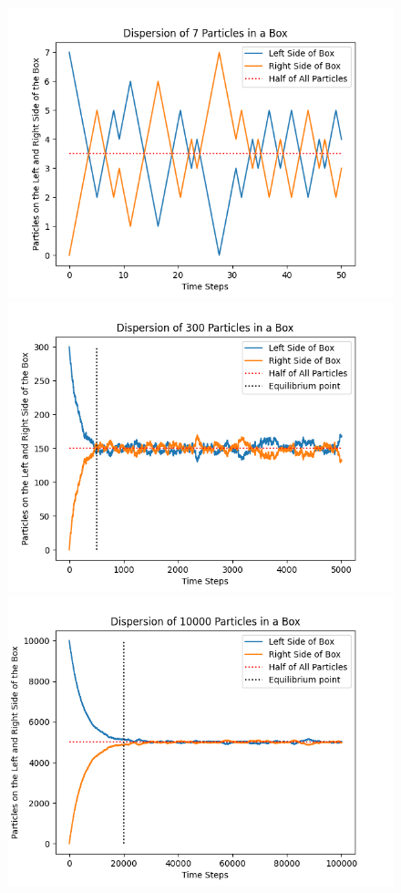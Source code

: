 \documentclass[12pt, A4]{article}
\begin{document}
\begin{figure}[h]
  \centering
    \includegraphics[scale=0.50]{Task_2_Line_7}
    \includegraphics[scale=0.50]{Task_2_Line}
    \includegraphics[scale=0.50]{Task_2_Line_10000}

\end{figure}
\end{document}

